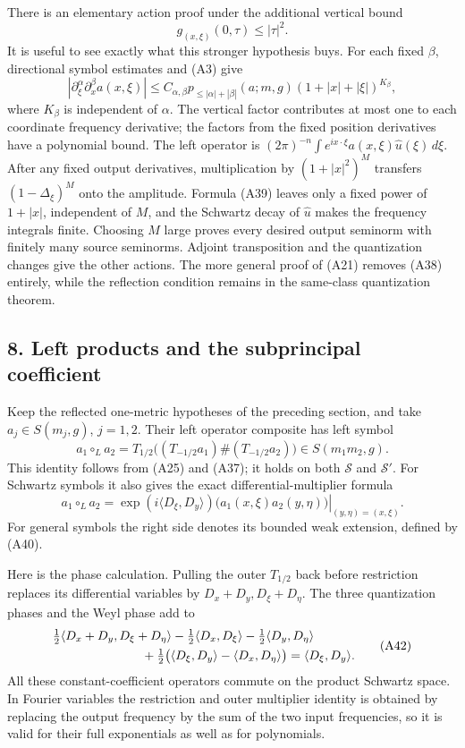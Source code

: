 \documentclass[
  11pt,
]{article}
\begin{document}
There is an elementary action proof under the additional vertical bound
\[
g_{(x,\xi)}(0,\tau)\le|\tau|^2.
\tag{A38}
\] It is useful to see exactly what this stronger hypothesis buys. For
each fixed \(\beta\), directional symbol estimates and (A3) give \[
|\partial_\xi^\alpha\partial_x^\beta a(x,\xi)|
\le C_{\alpha,\beta}p_{\le|\alpha|+|\beta|}(a;m,g)
(1+|x|+|\xi|)^{K_\beta},
\tag{A39}
\] where \(K_\beta\) is independent of \(\alpha\). The vertical factor
contributes at most one to each coordinate frequency derivative; the
factors from the fixed position derivatives have a polynomial bound. The
left operator is
\((2\pi)^{-n}\int e^{ix\cdot\xi}a(x,\xi)\widehat u(\xi)\,d\xi\). After
any fixed output derivatives, multiplication by \((1+|x|^2)^M\)
transfers \((1-\Delta_\xi)^M\) onto the amplitude. Formula (A39) leaves
only a fixed power of \(1+|x|\), independent of \(M\), and the Schwartz
decay of \(\widehat u\) makes the frequency integrals finite. Choosing
\(M\) large proves every desired output seminorm with finitely many
source seminorms. Adjoint transposition and the quantization changes
give the other actions. The more general proof of (A21) removes (A38)
entirely, while the reflection condition remains in the same-class
quantization theorem.

\subsection{8. Left products and the subprincipal
coefficient}\label{left-products-and-the-subprincipal-coefficient}

Keep the reflected one-metric hypotheses of the preceding section, and
take \(a_j\in S(m_j,g)\), \(j=1,2\). Their left operator composite has
left symbol \[
a_1\circ_L a_2
=T_{1/2}\big((T_{-1/2}a_1)\#(T_{-1/2}a_2)\big)
\in S(m_1m_2,g).
\tag{A40}
\] This identity follows from (A25) and (A37); it holds on both
\(\mathcal S\) and \(\mathcal S'\). For Schwartz symbols it also gives
the exact differential-multiplier formula \[
a_1\circ_L a_2
=\left.\exp(i\langle D_\xi,D_y\rangle)
\big(a_1(x,\xi)a_2(y,\eta)\big)\right|_{(y,\eta)=(x,\xi)}.
\tag{A41}
\] For general symbols the right side denotes its bounded weak
extension, defined by (A40).

Here is the phase calculation. Pulling the outer \(T_{1/2}\) back before
restriction replaces its differential variables by
\(D_x+D_y,D_\xi+D_\eta\). The three quantization phases and the Weyl
phase add to \[
\begin{split}
&\tfrac12\langle D_x+D_y,D_\xi+D_\eta\rangle
-\tfrac12\langle D_x,D_\xi\rangle-\tfrac12\langle D_y,D_\eta\rangle\\
&\hspace{25mm}
+\tfrac12\big(\langle D_\xi,D_y\rangle-\langle D_x,D_\eta\rangle\big)
=\langle D_\xi,D_y\rangle.
\end{split}
\tag{A42}
\] All these constant-coefficient operators commute on the product
Schwartz space. In Fourier variables the restriction and outer
multiplier identity is obtained by replacing the output frequency by the
sum of the two input frequencies, so it is valid for their full
exponentials as well as for polynomials.
\end{document}
